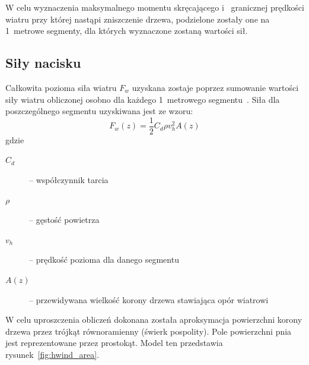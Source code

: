 W celu wyznaczenia maksymalnego momentu skręcającego i ~granicznej prędkości wiatru przy której nastąpi zniszczenie drzewa, podzielone zostały one na 1~metrowe segmenty, dla których wyznaczone zostaną wartości sił.

\subsection{Siły nacisku}

Całkowita pozioma siła wiatru $F_w$ uzyskana zostaje poprzez sumowanie wartości siły wiatru obliczonej osobno dla każdego 1~metrowego segmentu~\cite{hpsk_hwind}. Siła dla poszczególnego segmentu uzyskiwana jest ze wzoru:
\begin{equation}
\label{eq:windForce}
 	F_w(z) = \frac{1}{2}C_d  \rho v_h^2 A(z)
\end{equation}
gdzie
\begin{description}
	\item[$C_d$] -- współczynnik tarcia
	\item[$\rho$ ]-- gęstość powietrza
	\item[$v_h$ ]-- prędkość pozioma dla danego segmentu
	\item[$A(z)$]-- przewidywana wielkość korony drzewa stawiająca opór wiatrowi
\end{description}

W celu uproszczenia obliczeń dokonana została aproksymacja powierzchni korony drzewa przez trójkąt równoramienny (świerk pospolity). Pole powierzchni pnia jest reprezentowane przez prostokąt. Model ten przedstawia rysunek~\ref{fig:hwind_area}.

